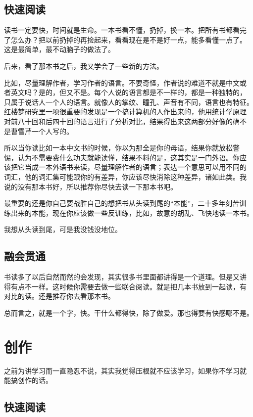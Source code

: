 \documentclass[10pt]{article}
\begin{document}
\begin{CJK*}{UTF8}{simsun}
\subsection{快速阅读}

读书一定要快，时间就是生命。一本书看不懂，扔掉，换一本。把所有书都看完
了怎么办？把以前扔掉的再捡起来，看看现在是不是好一点，能多看懂一点了。
这是最简单，最不动脑子的做法了。

后来，看了那本书之后，我又学会了一些新的方法。

比如，尽量理解作者，学习作者的语言。不要奇怪，作者说的难道不就是中文或
者英文吗？是的，但又不是。每个人说的语言都是不一样的，都是一种独特的，
只属于说话人一个人的语言。就像人的掌纹、瞳孔、声音有不同，语言也有特征。
红楼梦研究里一项很重要的发现是一个搞计算机的人作出来的，他用统计学原理
对前八十回和后四十回的语言进行了分析对比，结果得出来这两部分好像的确不
是曹雪芹一个人写的。

所以当你读比如一本中文书的时候，你以为那全是你的母语，结果你就放松警
惕，认为不需要费什么功夫就能读懂，结果不料的是，这其实是一门外语。你应
该把它当成一本外语书来读，尽量理解作者的语言；表达一个意思可以用不同的
词汇，他的词汇集可能跟你的有差异，你应该尽快消除这种差异，诸如此类。我
说的没有那本书好，所以推荐你尽快去读一下那本书吧。

最重要的还是你自己要战胜自己的想把书从头读到尾的“本能”，二十多年刻苦训
练出来的本能，现在你应该做一些反训练，比如，故意的胡乱、飞快地读一本书。

我想从头读到尾，可是我没钱没地位。

\subsection{融会贯通}

书读多了以后自然而然的会发现，其实很多书里面都讲得是一个道理。但是又讲
得有点不一样。这时候你需要去做一些联合阅读。就是把几本书放到一起读，有
对比的读。还是推荐你去看那本书。

总而言之，就是一个字，快。干什么都得快，除了做爱。那也得要有快感哪不是。

\section{创作}

之前为讲学习而一直隐忍不说，其实我觉得压根就不应该学习，如果你不学习就
能搞创作的话。

\subsection{快速阅读}






\end{CJK*}
\end{document}
